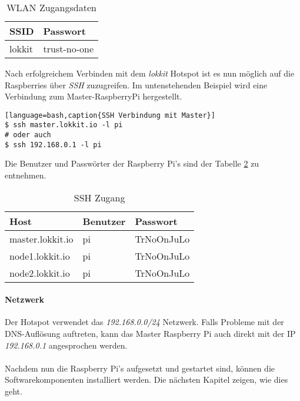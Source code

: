 \begin{table}[]
\centering
\caption{WLAN Zugangsdaten}
\label{tbl:wlan_zugang}
\begin{tabular}{@{}ll@{}}
\toprule
SSID    & Passwort \\ \midrule 
lokkit  & trust-no-one \\ \bottomrule
\end{tabular}
\end{table}


Nach erfolgreichem Verbinden mit dem \emph{lokkit} Hotspot ist es nun möglich auf die Raspberries über \emph{SSH} zuzugreifen. Im untenstehenden Beispiel wird eine Verbindung zum Master-RaspberryPi hergestellt. 

\begin{lstlisting}[language=bash,caption{SSH Verbindung mit Master}]
$ ssh master.lokkit.io -l pi
# oder auch
$ ssh 192.168.0.1 -l pi
\end{lstlisting}

Die Benutzer und Passwörter der Raspberry Pi's sind der Tabelle \ref{tbl:raspberry_zugang} zu entnehmen.

\begin{table}[]
\centering
\caption{SSH Zugang}
\label{tbl:raspberry_zugang}
\begin{tabular}{@{}lll@{}}
\toprule
Host              & Benutzer   & Passwort \\ \midrule
master.lokkit.io  & pi         & TrNoOnJuLo \\ \midrule
node1.lokkit.io   & pi         & TrNoOnJuLo \\ \midrule
node2.lokkit.io   & pi         & TrNoOnJuLo \\ \bottomrule
\end{tabular}
\end{table}


\paragraph{Netzwerk} 
Der Hotspot verwendet das \emph{192.168.0.0/24} Netzwerk. Falls Probleme mit der DNS-Auflösung auftreten, kann das Master Raspberry Pi auch direkt mit der IP \emph{192.168.0.1} angesprochen werden.

\paragraph{}
Nachdem nun die Raspberry Pi's aufgesetzt und gestartet sind, können die Softwarekomponenten installiert werden. Die nächsten Kapitel zeigen, wie dies geht.








